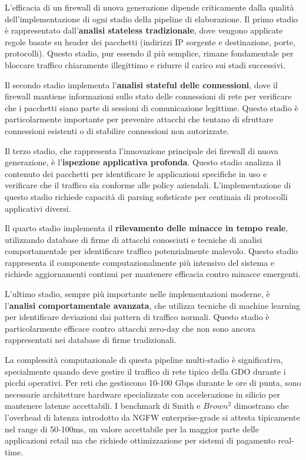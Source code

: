 {L'efficacia di un firewall di nuova generazione dipende criticamente dalla qualità dell'implementazione di ogni stadio della pipeline di elaborazione. Il primo stadio è rappresentato dall'\textbf{analisi stateless tradizionale}, dove vengono applicate regole basate su header dei pacchetti (indirizzi IP sorgente e destinazione, porte, protocolli). Questo stadio, pur essendo il più semplice, rimane fondamentale per bloccare traffico chiaramente illegittimo e ridurre il carico sui stadi successivi.

Il secondo stadio implementa l'\textbf{analisi stateful delle connessioni}, dove il firewall mantiene informazioni sullo stato delle connessioni di rete per verificare che i pacchetti siano parte di sessioni di comunicazione legittime. Questo stadio è particolarmente importante per prevenire attacchi che tentano di sfruttare connessioni esistenti o di stabilire connessioni non autorizzate.

Il terzo stadio, che rappresenta l'innovazione principale dei firewall di nuova generazione, è l'\textbf{ispezione applicativa profonda}. Questo stadio analizza il contenuto dei pacchetti per identificare le applicazioni specifiche in uso e verificare che il traffico sia conforme alle policy aziendali. L'implementazione di questo stadio richiede capacità di parsing sofisticate per centinaia di protocolli applicativi diversi.

Il quarto stadio implementa il \textbf{rilevamento delle minacce in tempo reale}, utilizzando database di firme di attacchi conosciuti e tecniche di analisi comportamentale per identificare traffico potenzialmente malevolo. Questo stadio rappresenta il componente computazionalmente più intensivo del sistema e richiede aggiornamenti continui per mantenere efficacia contro minacce emergenti.

L'ultimo stadio, sempre più importante nelle implementazioni moderne, è l'\textbf{analisi comportamentale avanzata}, che utilizza tecniche di machine learning per identificare deviazioni dai pattern di traffico normali. Questo stadio è particolarmente efficace contro attacchi zero-day che non sono ancora rappresentati nei database di firme tradizionali.

La complessità computazionale di questa pipeline multi-stadio è significativa, specialmente quando deve gestire il traffico di rete tipico della GDO durante i picchi operativi. Per reti che gestiscono 10-100 Gbps durante le ore di punta, sono necessarie architetture hardware specializzate con accelerazione in silicio per mantenere latenze accettabili. I benchmark di Smith e $Brown$$^{2}$ dimostrano che l'overhead di latenza introdotto da NGFW enterprise-grade si attesta tipicamente nel range di 50-100ms, un valore accettabile per la maggior parte delle applicazioni retail ma che richiede ottimizzazione per sistemi di pagamento real-time.

}
